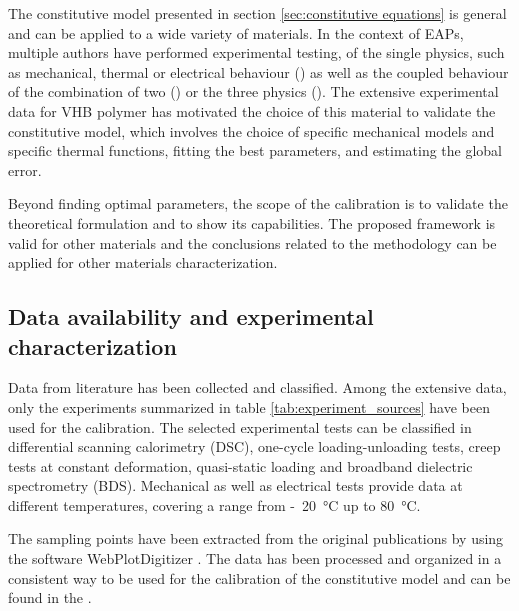 
The constitutive model presented in section \ref{sec:constitutive equations} is general and can be applied to a wide variety of materials. In the context of EAPs, multiple authors have performed experimental testing, of the single physics, such as mechanical, thermal or electrical behaviour (\cite{Hossain2012visco, Dippel2015}) as well as the coupled behaviour of the combination of two (\cite{Liao_Mokarram2020, Alkhoury2022}) or the three physics (\cite{Mehnert2021a,Sheng2012, Qin2023}).
The extensive experimental data for VHB polymer has motivated the choice of this material to validate the constitutive model, which involves the choice of specific mechanical models and specific thermal functions, fitting the best parameters, and estimating the global error.

Beyond finding optimal parameters, the scope of the calibration is to validate the theoretical formulation and to show its capabilities. The proposed framework is valid for other materials and the conclusions related to the methodology can be applied for other materials characterization.



\subsection{Data availability and experimental characterization}

Data from literature has been collected and classified. Among the extensive data, only the experiments summarized in table \ref{tab:experiment_sources} have been used for the calibration. The selected experimental tests can be classified in differential scanning calorimetry (DSC), one-cycle loading-unloading tests, creep tests at constant deformation, quasi-static loading and broadband dielectric spectrometry (BDS). 
Mechanical as well as electrical tests provide data at different temperatures, covering a range from \si{-20\celsius} up to \si{80\celsius}.

The sampling points have been extracted from the original publications by using the software WebPlotDigitizer \cite{webplotdigitizer}. The data has been processed and organized in a consistent way to be used for the calibration of the constitutive model and can be found in the .


